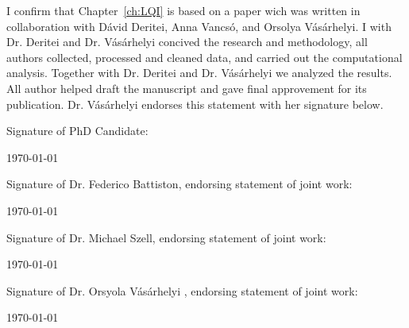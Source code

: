 \documentclass[a4paper,twoside,12pt]{book}
\begin{document}
\vspace{.2cm}

\noindent
I confirm that Chapter~\ref{ch:LQI} is based on a paper wich was written in collaboration with D\'avid Deritei, Anna Vancs\'o, and Orsolya V\'as\'arhelyi. I with Dr. Deritei and Dr. V\'as\'arhelyi concived the research and methodology, all authors collected, processed and cleaned data, and carried out the computational analysis. Together with Dr. Deritei and Dr. V\'as\'arhelyi we analyzed the results. All author helped draft the manuscript and gave final approvement for its publication. Dr. V\'as\'arhelyi endorses this statement with her signature below.

\vspace{0.5cm}
\noindent
Signature of PhD Candidate:

\vspace{2cm}
\noindent
\monthyeardate\today


\vspace{3.5cm}
\noindent
Signature of Dr. Federico Battiston, endorsing statement of joint work:

\vspace{2cm}
\noindent
\monthyeardate\today


\vspace{3.5cm}
\noindent
Signature of Dr. Michael Szell, endorsing statement of joint work:

\vspace{2cm}
\noindent
\monthyeardate\today

\vspace{3.5cm}
\noindent
Signature of Dr. Orsyola V\'as\'arhelyi , endorsing statement of joint work:

\vspace{2cm}
\noindent
\monthyeardate\today
\end{document}
